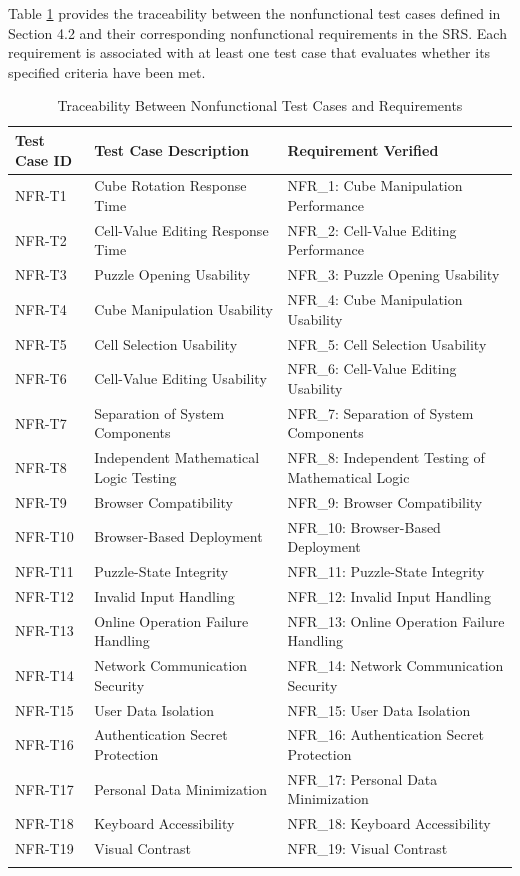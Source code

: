\documentclass[12pt, titlepage]{article}
\begin{document}
Table \ref{tab:TestTraceability} provides the traceability
between the nonfunctional test cases defined in Section 4.2
and their corresponding nonfunctional requirements in the SRS.
Each requirement is associated with at least one test case
that evaluates whether its specified criteria have been met.

\begin{longtable}{|p{}|p{}|p{}|}
\hline
\textbf{Test Case ID} & \textbf{Test Case Description} & \textbf{Requirement Verified} \\
\hline
NFR-T1 & Cube Rotation Response Time & NFR\_1: Cube Manipulation Performance \\
\hline
NFR-T2 & Cell-Value Editing Response Time & NFR\_2: Cell-Value Editing Performance \\
\hline
NFR-T3 & Puzzle Opening Usability & NFR\_3: Puzzle Opening Usability \\
\hline
NFR-T4 & Cube Manipulation Usability & NFR\_4: Cube Manipulation Usability \\
\hline
NFR-T5 & Cell Selection Usability & NFR\_5: Cell Selection Usability \\
\hline
NFR-T6 & Cell-Value Editing Usability & NFR\_6: Cell-Value Editing Usability \\
\hline
NFR-T7 & Separation of System Components & NFR\_7: Separation of System Components \\
\hline
NFR-T8 & Independent Mathematical Logic Testing & NFR\_8: Independent Testing of Mathematical Logic \\
\hline
NFR-T9 & Browser Compatibility & NFR\_9: Browser Compatibility \\
\hline
NFR-T10 & Browser-Based Deployment & NFR\_10: Browser-Based Deployment \\
\hline
NFR-T11 & Puzzle-State Integrity & NFR\_11: Puzzle-State Integrity \\
\hline
NFR-T12 & Invalid Input Handling & NFR\_12: Invalid Input Handling \\
\hline
NFR-T13 & Online Operation Failure Handling & NFR\_13: Online Operation Failure Handling \\
\hline
NFR-T14 & Network Communication Security & NFR\_14: Network Communication Security \\
\hline
NFR-T15 & User Data Isolation & NFR\_15: User Data Isolation \\
\hline
NFR-T16 & Authentication Secret Protection & NFR\_16: Authentication Secret Protection \\
\hline
NFR-T17 & Personal Data Minimization & NFR\_17: Personal Data Minimization \\
\hline
NFR-T18 & Keyboard Accessibility & NFR\_18: Keyboard Accessibility \\
\hline
NFR-T19 & Visual Contrast & NFR\_19: Visual Contrast \\
\hline
\caption{Traceability Between Nonfunctional Test Cases and Requirements}
\label{tab:TestTraceability}
\end{longtable}
\end{document}
